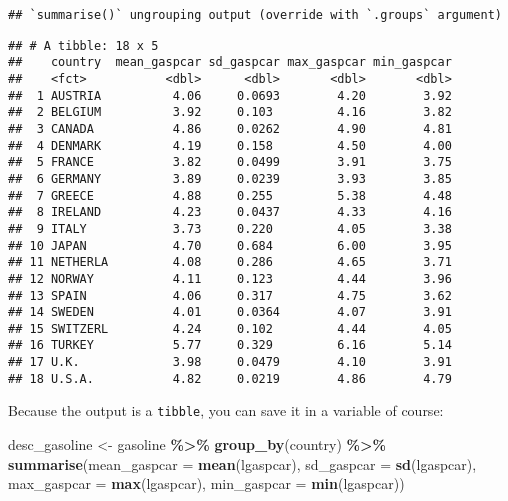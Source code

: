 \documentclass[
]{article}
\newenvironment{Shaded}{\begin{snugshade}}{\end{snugshade}}
\newcommand{\DataTypeTok}[1]{\textcolor[rgb]{0.13,0.29,0.53}{#1}}
\newcommand{\KeywordTok}[1]{\textcolor[rgb]{0.13,0.29,0.53}{\textbf{#1}}}
\newcommand{\NormalTok}[1]{#1}
\newcommand{\OperatorTok}[1]{\textcolor[rgb]{0.81,0.36,0.00}{\textbf{#1}}}
\newcommand{\StringTok}[1]{\textcolor[rgb]{0.31,0.60,0.02}{#1}}
\begin{document}
\begin{verbatim}
## `summarise()` ungrouping output (override with `.groups` argument)
\end{verbatim}

\begin{verbatim}
## # A tibble: 18 x 5
##    country  mean_gaspcar sd_gaspcar max_gaspcar min_gaspcar
##    <fct>           <dbl>      <dbl>       <dbl>       <dbl>
##  1 AUSTRIA          4.06     0.0693        4.20        3.92
##  2 BELGIUM          3.92     0.103         4.16        3.82
##  3 CANADA           4.86     0.0262        4.90        4.81
##  4 DENMARK          4.19     0.158         4.50        4.00
##  5 FRANCE           3.82     0.0499        3.91        3.75
##  6 GERMANY          3.89     0.0239        3.93        3.85
##  7 GREECE           4.88     0.255         5.38        4.48
##  8 IRELAND          4.23     0.0437        4.33        4.16
##  9 ITALY            3.73     0.220         4.05        3.38
## 10 JAPAN            4.70     0.684         6.00        3.95
## 11 NETHERLA         4.08     0.286         4.65        3.71
## 12 NORWAY           4.11     0.123         4.44        3.96
## 13 SPAIN            4.06     0.317         4.75        3.62
## 14 SWEDEN           4.01     0.0364        4.07        3.91
## 15 SWITZERL         4.24     0.102         4.44        4.05
## 16 TURKEY           5.77     0.329         6.16        5.14
## 17 U.K.             3.98     0.0479        4.10        3.91
## 18 U.S.A.           4.82     0.0219        4.86        4.79
\end{verbatim}

Because the output is a \texttt{tibble}, you can save it in a variable of course:

\begin{Shaded}
\begin{Highlighting}[]
\NormalTok{desc\_gasoline \textless{}{-}}\StringTok{ }\NormalTok{gasoline }\OperatorTok{\%\textgreater{}\%}
\StringTok{  }\KeywordTok{group\_by}\NormalTok{(country) }\OperatorTok{\%\textgreater{}\%}
\StringTok{  }\KeywordTok{summarise}\NormalTok{(}\DataTypeTok{mean\_gaspcar =} \KeywordTok{mean}\NormalTok{(lgaspcar),}
            \DataTypeTok{sd\_gaspcar =} \KeywordTok{sd}\NormalTok{(lgaspcar),}
            \DataTypeTok{max\_gaspcar =} \KeywordTok{max}\NormalTok{(lgaspcar),}
            \DataTypeTok{min\_gaspcar =} \KeywordTok{min}\NormalTok{(lgaspcar))}
\end{Highlighting}
\end{Shaded}
\end{document}
